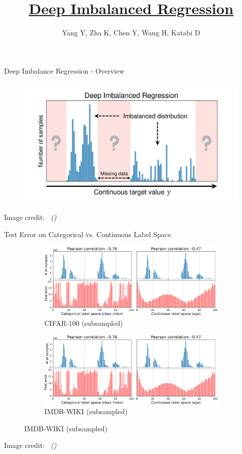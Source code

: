 \documentclass[dvipsnames,
hyperref={
	citecolor=blue,
	colorlinks=true,
	urlcolor=blue,
	linkcolor=,
}
]{beamer}
\title[Deep Imbalanced Regression]
{\href{https://doi.org/10.48550/arXiv.2102.09554}{Deep Imbalanced Regression}}
\author[Yang Y. et al.]{Yang Y, Zha K, Chen Y, Wang H, Katabi D}
\date{}%
\newcommand{\credit}[2]{{\par\hfill \tiny #1 credit:~\itshape{\color{blue} \citeauthor{#2} (\citeyear{#2})}}}
\begin{document}
	
\begin{frame}
\titlepage
\end{frame}

\begin{frame}{Deep Imbalance Regression - Overview}
	\begin{figure}[h]
		\includegraphics[width=\linewidth]{images/teaser.pdf}
	\end{figure}
	\credit{Image}{yang2021delving}
\end{frame}

\begin{frame}{Test Error on Categorical vs. Continuous Label Space}
	\begin{figure}[h]
	\begin{subfigure}{0.48\textwidth}
		\includegraphics[width=\linewidth]{images/err_motivate_1_left.pdf}
		\caption{CIFAR-100 (subsampled)}
	\end{subfigure}\hspace{1em}%
	\begin{subfigure}{0.48\textwidth}
		\includegraphics[width=\linewidth]{images/err_motivate_1_right.pdf}
		\caption{IMDB-WIKI (subsampled)}
	\end{subfigure}
	\end{figure}
	\credit{Image}{yang2021delving}
\end{frame}
\end{document}
